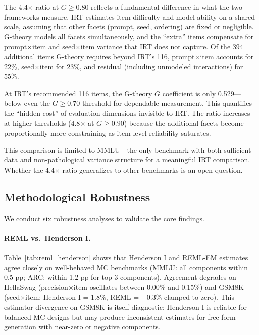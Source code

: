 \documentclass[11pt]{article}
\begin{document}
The 4.4$\times$ ratio at $G \geq 0.80$ reflects a fundamental difference in what the two frameworks measure.
IRT estimates item difficulty and model ability on a shared scale, assuming that other facets (prompt, seed, ordering) are fixed or negligible.
G-theory models all facets simultaneously, and the ``extra'' items compensate for prompt$\times$item and seed$\times$item variance that IRT does not capture.
Of the 394 additional items G-theory requires beyond IRT's 116, prompt$\times$item accounts for 22\%, seed$\times$item for 23\%, and residual (including unmodeled interactions) for 55\%.

At IRT's recommended 116 items, the G-theory $G$ coefficient is only 0.529---below even the $G \geq 0.70$ threshold for dependable measurement.
This quantifies the ``hidden cost'' of evaluation dimensions invisible to IRT.
The ratio increases at higher thresholds (4.8$\times$ at $G \geq 0.90$) because the additional facets become proportionally more constraining as item-level reliability saturates.

This comparison is limited to MMLU---the only benchmark with both sufficient data and non-pathological variance structure for a meaningful IRT comparison.
Whether the 4.4$\times$ ratio generalizes to other benchmarks is an open question.

\subsection{Methodological Robustness}
\label{sec:robustness}

We conduct six robustness analyses to validate the core findings.

\paragraph{REML vs.\ Henderson I.}
Table~\ref{tab:reml_henderson} shows that Henderson I and REML-EM estimates agree closely on well-behaved MC benchmarks (MMLU: all components within 0.5 pp; ARC: within 1.2 pp for top-3 components).
Agreement degrades on HellaSwag (precision$\times$item oscillates between 0.00\% and 0.15\%) and GSM8K (seed$\times$item: Henderson I = 1.8\%, REML = $-0.3\%$ clamped to zero).
This estimator divergence on GSM8K is itself diagnostic: Henderson I is reliable for balanced MC designs but may produce inconsistent estimates for free-form generation with near-zero or negative components.
\end{document}
